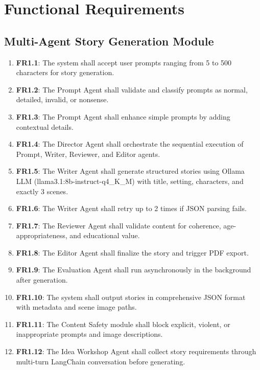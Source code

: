 \section{Functional Requirements}

\subsection{Multi-Agent Story Generation Module}
\begin{enumerate}
    \item \textbf{FR1.1}: The system shall accept user prompts ranging from 5 to 500 characters for story generation.
    \item \textbf{FR1.2}: The Prompt Agent shall validate and classify prompts as normal, detailed, invalid, or nonsense.
    \item \textbf{FR1.3}: The Prompt Agent shall enhance simple prompts by adding contextual details.
    \item \textbf{FR1.4}: The Director Agent shall orchestrate the sequential execution of Prompt, Writer, Reviewer, and Editor agents.
    \item \textbf{FR1.5}: The Writer Agent shall generate structured stories using Ollama LLM (llama3.1:8b-instruct-q4\_K\_M) with title, setting, characters, and exactly 3 scenes.
    \item \textbf{FR1.6}: The Writer Agent shall retry up to 2 times if JSON parsing fails.
    \item \textbf{FR1.7}: The Reviewer Agent shall validate content for coherence, age-appropriateness, and educational value.
    \item \textbf{FR1.8}: The Editor Agent shall finalize the story and trigger PDF export.
    \item \textbf{FR1.9}: The Evaluation Agent shall run asynchronously in the background after generation.
    \item \textbf{FR1.10}: The system shall output stories in comprehensive JSON format with metadata and scene image paths.
    \item \textbf{FR1.11}: The Content Safety module shall block explicit, violent, or inappropriate prompts and image descriptions.
    \item \textbf{FR1.12}: The Idea Workshop Agent shall collect story requirements through multi-turn LangChain conversation before generating.
\end{enumerate}

